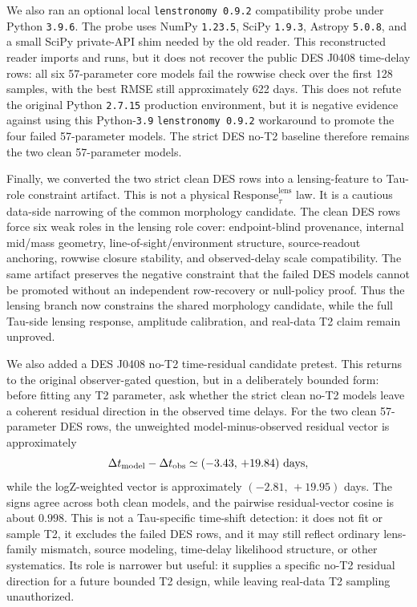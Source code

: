 \documentclass[11pt]{article}
\begin{document}
We also ran an optional local \texttt{lenstronomy 0.9.2} compatibility probe
under Python \texttt{3.9.6}.  The probe uses NumPy \texttt{1.23.5}, SciPy
\texttt{1.9.3}, Astropy \texttt{5.0.8}, and a small SciPy private-API shim
needed by the old reader.  This reconstructed reader imports and runs, but it
does not recover the public DES J0408 time-delay rows: all six 57-parameter
core models fail the rowwise check over the first 128 samples, with the best
RMSE still approximately 622 days.  This does not refute the original Python
\texttt{2.7.15} production environment, but it is negative evidence against
using this Python-\texttt{3.9} \texttt{lenstronomy 0.9.2} workaround to promote
the four failed 57-parameter models.  The strict DES no-T2 baseline therefore
remains the two clean 57-parameter models.

Finally, we converted the two strict clean DES rows into a lensing-feature to
Tau-role constraint artifact.  This is not a physical
\(\mathrm{Response}_{\tau}^{\mathrm{lens}}\) law.  It is a cautious
data-side narrowing of the common morphology candidate.  The clean DES rows
force six weak roles in the lensing role cover: endpoint-blind provenance,
internal mid/mass geometry, line-of-sight/environment structure, source-readout
anchoring, rowwise closure stability, and observed-delay scale compatibility.
The same artifact preserves the negative constraint that the failed DES models
cannot be promoted without an independent row-recovery or null-policy proof.
Thus the lensing branch now constrains the shared morphology candidate, while
the full Tau-side lensing response, amplitude calibration, and real-data T2
claim remain unproved.

We also added a DES J0408 no-T2 time-residual candidate pretest.  This returns
to the original observer-gated question, but in a deliberately bounded form:
before fitting any T2 parameter, ask whether the strict clean no-T2 models leave
a coherent residual direction in the observed time delays.  For the two clean
57-parameter DES rows, the unweighted model-minus-observed residual vector is
approximately
\[
  \Delta t_{\mathrm{model}}-\Delta t_{\mathrm{obs}}
  \simeq (-3.43,\,+19.84)\ {\rm days},
\]
while the logZ-weighted vector is approximately \((-2.81,\,+19.95)\) days.
The signs agree across both clean models, and the pairwise residual-vector
cosine is about \(0.998\).  This is not a Tau-specific time-shift detection:
it does not fit or sample T2, it excludes the failed DES rows, and it may still
reflect ordinary lens-family mismatch, source modeling, time-delay likelihood
structure, or other systematics.  Its role is narrower but useful: it supplies a
specific no-T2 residual direction for a future bounded T2 design, while leaving
real-data T2 sampling unauthorized.
\end{document}
